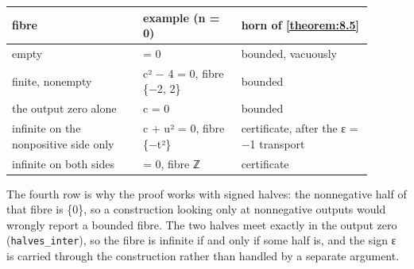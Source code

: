 \begin{longtable}{@{}>{\raggedright\arraybackslash}p{0.328\linewidth}>{\raggedright\arraybackslash}p{0.243\linewidth}>{\raggedright\arraybackslash}p{0.329\linewidth}@{}}
\toprule
fibre & example (n = 0) & horn of \cref{theorem:8.5} \\
\midrule\endhead
empty & 1 = 0 & bounded, vacuously \\
finite, nonempty & c² − 4 = 0, fibre \{−2, 2\} & bounded \\
the output zero alone & c = 0 & bounded \\
infinite on the nonpositive side only & c + u² = 0, fibre \{−t²\} & certificate, after the ε = −1 transport \\
infinite on both sides & 0 = 0, fibre ℤ & certificate \\
\bottomrule
\end{longtable}
The fourth row is why the proof works with signed halves: the nonnegative half of that fibre is \{0\}, so a construction looking only at nonnegative outputs would wrongly report a bounded fibre. The two halves meet exactly in the output zero (\texttt{halves\_\allowbreak{}inter}), so the fibre is infinite if and only if some half is, and the sign ε is carried through the construction rather than handled by a separate argument.


